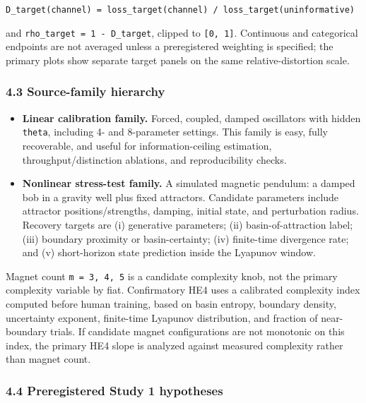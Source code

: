 \documentclass[
  11pt,
]{article}
\providecommand{\tightlist}{%
  \setlength{\itemsep}{0pt}\setlength{\parskip}{0pt}}
\begin{document}
\texttt{D\_target(channel)\ =\ loss\_target(channel)\ /\ loss\_target(uninformative)}

and \texttt{rho\_target\ =\ 1\ -\ D\_target},
clipped to \texttt{{[}0,\ 1{]}}. Continuous and
categorical endpoints are not averaged unless a
preregistered weighting is specified; the
primary plots show separate target panels on the
same relative-distortion scale.

\subsubsection{4.3 Source-family
hierarchy}\label{source-family-hierarchy}

\begin{itemize}
\tightlist
\item
  \textbf{Linear calibration family.} Forced,
  coupled, damped oscillators with hidden
  \texttt{theta}, including 4- and 8-parameter
  settings. This family is easy, fully
  recoverable, and useful for
  information-ceiling estimation,
  throughput/distinction ablations, and
  reproducibility checks.
\item
  \textbf{Nonlinear stress-test family.} A
  simulated magnetic pendulum: a damped bob in a
  gravity well plus fixed attractors. Candidate
  parameters include attractor
  positions/strengths, damping, initial state,
  and perturbation radius. Recovery targets are
  (i) generative parameters; (ii)
  basin-of-attraction label; (iii) boundary
  proximity or basin-certainty; (iv) finite-time
  divergence rate; and (v) short-horizon state
  prediction inside the Lyapunov window.
\end{itemize}

Magnet count \texttt{m\ =\ 3,\ 4,\ 5} is a
candidate complexity knob, not the primary
complexity variable by fiat. Confirmatory HE4
uses a calibrated complexity index computed
before human training, based on basin entropy,
boundary density, uncertainty exponent,
finite-time Lyapunov distribution, and fraction
of near-boundary trials. If candidate magnet
configurations are not monotonic on this index,
the primary HE4 slope is analyzed against
measured complexity rather than magnet count.

\subsubsection{4.4 Preregistered Study 1
hypotheses}\label{preregistered-study-1-hypotheses}
\end{document}
